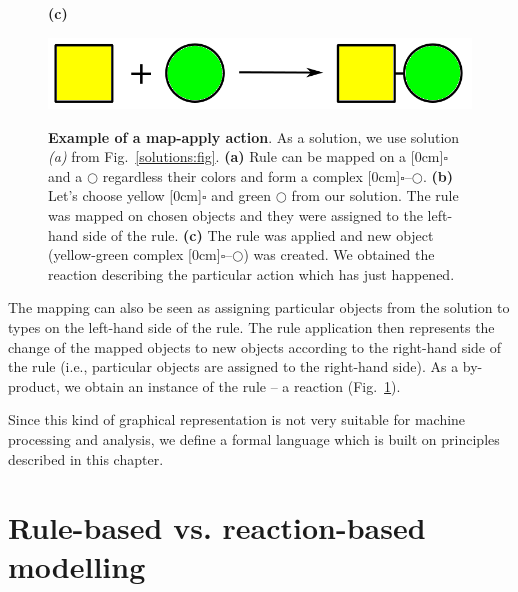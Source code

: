 \documentclass[12pt]{fithesis2}
\begin{document}
\begin{figure}[!h]
\begin{center}
\begin{minipage}[l]{0.1\textwidth}
    \textbf{(c)}
  \end{minipage}
  \begin{minipage}[r]{0.6\textwidth}
    {\hspace*{1.3cm}\includegraphics[scale=0.2]{pics/rule_reaction}}
\end{minipage}
\caption{\textbf{Example of a map-apply action}. As a solution, we use solution \emph{(a)} from Fig.~\ref{solutions:fig}. \textbf{(a)} Rule can be mapped on a \raisebox{-0.02cm}[0cm]{{\large $\square$}} and a $\bigcirc$ regardless their colors and form a complex \raisebox{-0.02cm}[0cm]{{\large $\square$}}--$\bigcirc$.  \textbf{(b)} Let's choose yellow \raisebox{-0.02cm}[0cm]{{\large $\square$}} and green $\bigcirc$ from our solution. The rule was mapped on chosen objects and they were assigned to the left-hand side of the rule. \textbf{(c)} The rule was applied and new object (yellow-green complex \raisebox{-0.02cm}[0cm]{{\large $\square$}}--$\bigcirc$) was created. We obtained the reaction describing the particular action which has just happened.}
\label{map-apply:fig}
\end{center}
\end{figure}

The mapping can also be seen as assigning particular objects from the solution to types on the left-hand side of the rule. The rule application then represents the change of the mapped objects to new objects according to the right-hand side of the rule (i.e., particular objects are assigned to the right-hand side). As a by-product, we obtain an instance of the rule -- a reaction (Fig.~\ref{map-apply:fig}). %

Since this kind of graphical representation is not very suitable for machine processing and analysis, we define a formal language which is built on principles described in this chapter.

\section{Rule-based vs. reaction-based modelling}
\end{document}
